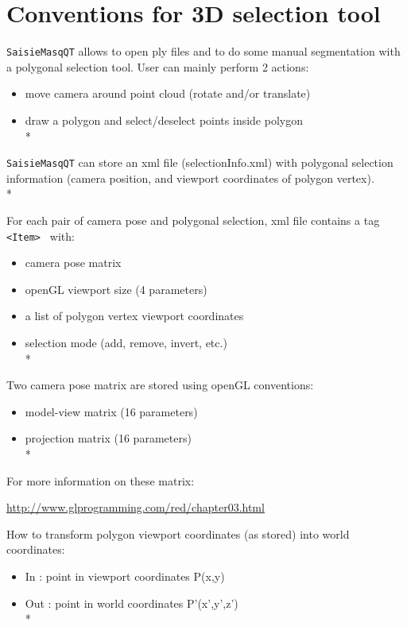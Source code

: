 

\section{Conventions for 3D selection tool}
\label{Conv:selection}

{\tt SaisieMasqQT} allows to open ply files and to do some manual segmentation with a polygonal selection tool.
User can mainly perform 2 actions:
\begin{itemize}
\item move camera around point cloud (rotate and/or translate)
\item draw a polygon and select/deselect points inside polygon\\*
\end{itemize}

{\tt SaisieMasqQT} can store an xml file (selectionInfo.xml) with polygonal selection information (camera position, and viewport coordinates of polygon vertex).\\*

For each pair of camera pose and polygonal selection, xml file contains a tag {\tt <Item> } with:
\begin{itemize}
\item camera pose matrix
\item openGL viewport size (4 parameters)
\item a list of polygon vertex viewport coordinates
\item selection mode (add, remove, invert, etc.)\\*
\end{itemize}

Two camera pose matrix are stored using openGL conventions:

\begin{itemize}
\item model-view matrix (16 parameters)
\item projection matrix (16 parameters)\\*
\end{itemize}

For more information on these matrix:

\url{http://www.glprogramming.com/red/chapter03.html}

How to transform polygon viewport coordinates (as stored) into world coordinates:

\begin{itemize}
\item In  : point in viewport coordinates P(x,y)
\item Out : point in world coordinates P'(x',y',z')\\*
\end{itemize}

